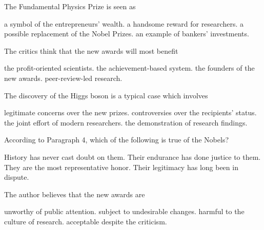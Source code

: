 \item The Fundamental Physics Prize is seen as
\begin{tasks}
	\task a symbol of the entrepreneurs' wealth.
	\task a handsome reward for researchers.
	\task a possible replacement of the Nobel Prizes.
	\task an example of bankers' investments.
\end{tasks}
\item The critics think that the new awards will most benefit
\begin{tasks}
	\task the profit-oriented scientists.
	\task the achievement-based system.
	\task the founders of the new awards.
	\task peer-review-led research.
\end{tasks}
\item The discovery of the Higgs boson is a typical case which involves
\begin{tasks}
	\task legitimate concerns over the new prizes.
	\task controversies over the recipients' status.
	\task the joint effort of modern researchers.
	\task the demonstration of research findings.
\end{tasks}
\item According to Paragraph 4, which of the following is true of the Nobels?
\begin{tasks}
	\task History has never cast doubt on them.
	\task Their endurance has done justice to them.
	\task They are the most representative honor.
	\task Their legitimacy has long been in dispute.
\end{tasks}
\item The author believes that the new awards are
\begin{tasks}
	\task unworthy of public attention.
	\task subject to undesirable changes.
	\task harmful to the culture of research.
	\task acceptable despite the criticism.
\end{tasks}
